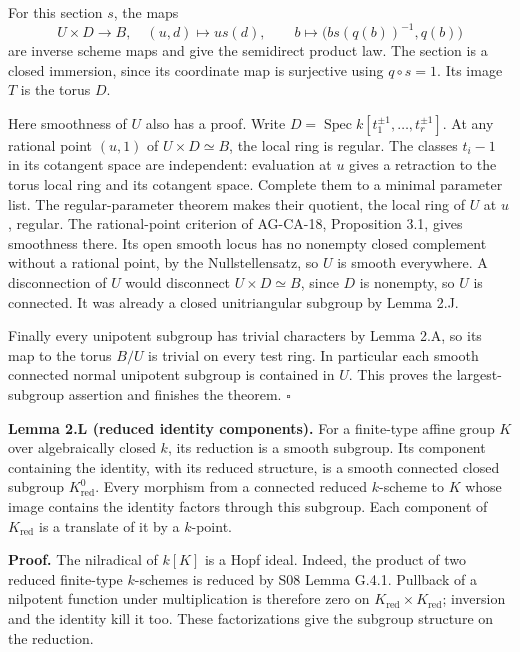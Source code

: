 \documentclass[11pt,a4paper,openany]{report}
\newcounter{none}
\begin{document}
For this section \(s\), the maps \[
U\times D\longrightarrow B,\quad(u,d)\longmapsto us(d),
\qquad
b\longmapsto\bigl(bs(q(b))^{-1},q(b)\bigr)
\] are inverse scheme maps and give the semidirect product law. The section is a closed immersion, since its coordinate map is surjective using \(q\circ s=1\). Its image \(T\) is the torus \(D\).

Here smoothness of \(U\) also has a proof. Write \(D=\operatorname{Spec}k[t_1^{\pm1},\ldots,t_r^{\pm1}]\). At any rational point \((u,1)\) of \(U\times D\simeq B\), the local ring is regular. The classes \(t_i-1\) in its cotangent space are independent: evaluation at \(u\) gives a retraction to the torus local ring and its cotangent space. Complete them to a minimal parameter list. The regular-parameter theorem makes their quotient, the local ring of \(U\) at \(u\), regular. The rational-point criterion of AG-CA-18, Proposition 3.1, gives smoothness there. Its open smooth locus has no nonempty closed complement without a rational point, by the Nullstellensatz, so \(U\) is smooth everywhere. A disconnection of \(U\) would disconnect \(U\times D\simeq B\), since \(D\) is nonempty, so \(U\) is connected. It was already a closed unitriangular subgroup by Lemma 2.J.

Finally every unipotent subgroup has trivial characters by Lemma 2.A, so its map to the torus \(B/U\) is trivial on every test ring. In particular each smooth connected normal unipotent subgroup is contained in \(U\). This proves the largest-subgroup assertion and finishes the theorem. \(\square\)

\textbf{Lemma 2.L (reduced identity components).} For a finite-type affine group \(K\) over algebraically closed \(k\), its reduction is a smooth subgroup. Its component containing the identity, with its reduced structure, is a smooth connected closed subgroup \(K^0_{\mathrm{red}}\). Every morphism from a connected reduced \(k\)-scheme to \(K\) whose image contains the identity factors through this subgroup. Each component of \(K_{\mathrm{red}}\) is a translate of it by a \(k\)-point.

\textbf{Proof.} The nilradical of \(k[K]\) is a Hopf ideal. Indeed, the product of two reduced finite-type \(k\)-schemes is reduced by S08 Lemma G.4.1. Pullback of a nilpotent function under multiplication is therefore zero on \(K_{\mathrm{red}}\times K_{\mathrm{red}}\); inversion and the identity kill it too. These factorizations give the subgroup structure on the reduction.
\end{document}
